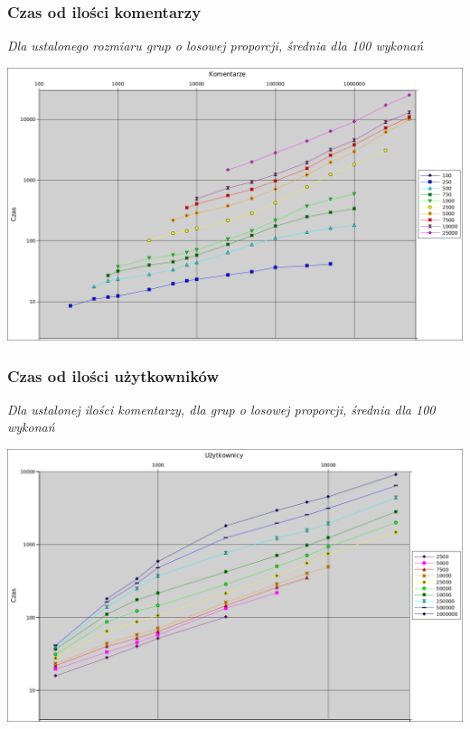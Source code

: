 \documentclass[11pt]{article}
\newcommand{\+}{\discretionary{\mbox{\scriptsize$\hookleftarrow$}}{}{}}
\begin{document}
\subsubsection{Czas od ilości komentarzy}
\textsl{Dla ustalonego rozmiaru grup o losowej proporcji, średnia dla 100 wykonań}\\
\begin{centering}
	\includegraphics[width=\textwidth]{Wykres1}
\end{centering}
\subsubsection{Czas od ilości użytkowników}
\textsl{Dla ustalonej ilości komentarzy, dla grup o losowej proporcji, średnia dla 100 wykonań}\\
\begin{centering}
	\includegraphics[width=\textwidth]{Wykres2}
\end{centering}
\end{document}
